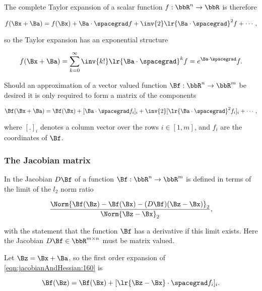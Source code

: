 The complete Taylor expansion of a scalar function \( f : \bbR^n \rightarrow \bbR \) is therefore

\begin{dmath}\label{eqn:jacobianAndHessian:120}
f(\Bx + \Ba)
= f(\Bx) +
\Ba \cdot \spacegrad f +
\inv{2} \lr{ \Ba \cdot \spacegrad}^2 f + \cdots,
\end{dmath}

so the Taylor expansion has an exponential structure

\begin{equation}\label{eqn:jacobianAndHessian:140}
f(\Bx + \Ba) = \sum_{k = 0}^\infty \inv{k!} \lr{ \Ba \cdot \spacegrad}^k f = e^{\Ba \cdot \spacegrad} f.
\end{equation}

Should an approximation of a vector valued function \( \Bf : \bbR^n \rightarrow \bbR^m \) be desired it is only required to form a matrix of the components

\begin{equation}\label{eqn:jacobianAndHessian:160}
\Bf(\Bx + \Ba)
= \Bf(\Bx) +
[\Ba \cdot \spacegrad f_i]_i +
\inv{2} [\lr{ \Ba \cdot \spacegrad}^2 f_i]_i + \cdots,
\end{equation}

where \( [.]_i \) denotes a column vector over the rows \( i \in [1,m] \), and \( f_i \) are the coordinates of \( \Bf \).

\subsubsection{The Jacobian matrix}

In \citep{boyd2004convex} the Jacobian \( D \Bf \) of a function \( \Bf : \bbR^n \rightarrow \bbR^m \) is defined in terms of the limit of the \( l_2 \) norm ratio

\begin{dmath}\label{eqn:jacobianAndHessian:180}
\frac{\Norm{\Bf(\Bz) - \Bf(\Bx) - (D \Bf) (\Bz - \Bx)}_2 }{ \Norm{\Bz - \Bx}_2 },
\end{dmath}

with the statement that the function \( \Bf \) has a derivative if this limit exists.  Here the Jacobian \( D \Bf \in \bbR^{m \times n} \) must be matrix valued.

Let \( \Bz = \Bx + \Ba \), so the first order expansion of \cref{eqn:jacobianAndHessian:160} is

\begin{dmath}\label{eqn:jacobianAndHessian:200}
\Bf(\Bz)
= \Bf(\Bx) + [\lr{ \Bz - \Bx } \cdot \spacegrad f_i]_i
.
\end{dmath}

